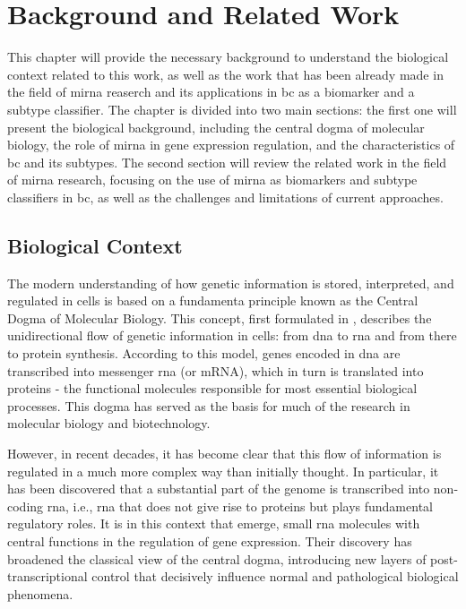 
%

\chapter{Background and Related Work}

This chapter will provide the necessary background to understand the biological
context related to this work, as well as the work that has been already made in
the field of \gls{mirna} reaserch and its applications in \gls{bc} as a
biomarker and a subtype classifier. The chapter is divided into two main
sections: the first one will present the biological background, including the
central dogma of molecular biology, the role of \gls{mirna} in gene expression
regulation, and the characteristics of \gls{bc} and its subtypes. The second
section will review the related work in the field of \gls{mirna} research,
focusing on the use of \gls{mirna} as biomarkers and subtype classifiers in
\gls{bc}, as well as the challenges and limitations of current approaches.

\section{Biological Context}
The modern understanding of how genetic information is stored, interpreted, and
regulated in cells is based on a fundamenta principle known as the Central
Dogma of Molecular Biology. This concept, first formulated in
\textcites{discovery_dna_Watson1953The, updated_disc_of_dna_Pray2008DNA},
describes the unidirectional flow of genetic information in cells: from
\gls{dna} to \gls{rna} and from there to protein synthesis. According to this
model, genes encoded in \gls{dna} are transcribed into messenger \gls{rna} (or
mRNA), which in turn is translated into proteins - the functional molecules
responsible for most essential biological processes. This dogma has served as
the basis for much of the research in molecular biology and biotechnology.

However, in recent decades, it has become clear that this flow of information
is regulated in a much more complex way than initially thought. In particular,
it has been discovered that a substantial part of the genome is transcribed
into non-coding \gls{rna}, i.e., \gls{rna} that does not give rise to proteins
but plays fundamental regulatory roles. It is in this context that
 emerge, small \gls{rna} molecules with central functions in
the regulation of gene expression. Their discovery has broadened the classical
view of the central dogma, introducing new layers of post-transcriptional
control that decisively influence normal and pathological biological phenomena.

